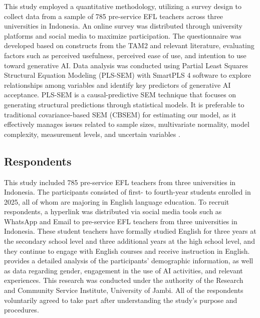 \documentclass[english]{textolivre}
\begin{document}
This study employed a quantitative methodology, utilizing a survey design to collect data from a sample of 785 pre-service EFL teachers across three universities in Indonesia. An online survey was distributed through university platforms and social media to maximize participation. The questionnaire was developed based on constructs from the TAM2 and relevant literature, evaluating factors such as perceived usefulness, perceived ease of use, and intention to use toward generative AI. Data analysis was conducted using Partial Least Squares Structural Equation Modeling (PLS-SEM) with SmartPLS 4 software to explore relationships among variables and identify key predictors of generative AI acceptance. PLS-SEM is a causal-predictive SEM technique that focuses on generating structural predictions through statistical models. It is preferable to traditional covariance-based SEM (CBSEM) for estimating our model, as it effectively manages issues related to sample sizes, multivariate normality, model complexity, measurement levels, and uncertain variables \cite{HairHowardNitzl2020CCA}.


\subsection{Respondents}\label{sec-modelo}
This study included 785 pre-service EFL teachers from three universities in Indonesia. The participants consisted of first- to fourth-year students enrolled in 2025, all of whom are majoring in English language education. To recruit respondents, a hyperlink was distributed via social media tools such as WhatsApp and Email to pre-service EFL teachers from three universities in Indonesia. These student teachers have formally studied English for three years at the secondary school level and three additional years at the high school level, and they continue to engage with English courses and receive instruction in English.  provides a detailed analysis of the participants’ demographic information, as well as data regarding gender, engagement in the use of AI activities, and relevant experiences. This research was conducted under the authority of the Research and Community Service Institute, University of Jambi. All of the respondents voluntarily agreed to take part after understanding the study’s purpose and procedures.
\end{document}
